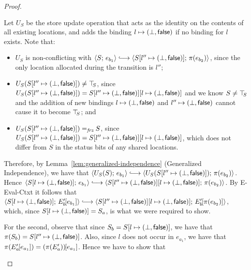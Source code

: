 \begin{proof}
\begin{enumerate}
\begin{enumerate}
\begin{itemize}
          Let $U_S$ be the store update operation that acts as the
          identity on the contents of all existing locations, and adds
          the binding $l \mapsto (\bot, \textsf{false})$ if no
          binding for $l$ exists.  Note that:
          \begin{itemize}
          \item $U_S$ is non-conflicting with $\config{S}{e_{b_1}}
            \parstepsto
            \config{\extS{S}{l''}{\bot}{\frozenfalse}}{\pi(e_{b_2})}$,
            since the only location allocated during the transition is
            $l''$;
          \item $U_S(S[l'' \mapsto (\bot, \textsf{false})]) \neq \top\hspace{-0.85mm}_{S}$,
            since $U_S(S[l'' \mapsto (\bot, \textsf{false})]) =
            S[l'' \mapsto (\bot, \textsf{false})][l \mapsto (\bot, \textsf{false})]$
            and we know $S \neq \top\hspace{-0.85mm}_{S}$ and the addition of new
            bindings $l \mapsto (\bot, \textsf{false})$ and
            $l'' \mapsto (\bot, \textsf{false})$ cannot cause it
            to become $\top\hspace{-0.85mm}_{S}$; and
          \item $U_S(S[l'' \mapsto (\bot, \textsf{false})]) =_{\textit{frz}} S$,
            since $U_S(S[l'' \mapsto (\bot, \textsf{false})]) =
            S[l'' \mapsto (\bot, \textsf{false})][l \mapsto (\bot, \textsf{false})]$,
            which does not differ from $S$ in the status bits of any
            shared locations.
          \end{itemize}

          Therefore, by Lemma~\ref{lem:generalized-independence}
          (Generalized Independence), we have that
          $\config{U_S(S)}{e_{b_1}} \parstepsto
          \config{U_S(\extS{S}{l''}{\bot}{\frozenfalse})}{\pi(e_{b_2})}$.
          Hence $\config{\extS{S}{l}{\bot}{\frozenfalse}}{e_{b_1}}
          \parstepsto
          \config{\extS{\extS{S}{l''}{\bot}{\frozenfalse}}{l}{\bot}{\frozenfalse}}{\pi(e_{b_2})}$.
          By {\sc E-Eval-Ctxt} it follows that
          $\config{\extS{S}{l}{\bot}{\frozenfalse}}{\evalctxt{E'_b}{e_{b_1}}}
          \parstepsto
          \config{\extS{\extS{S}{l''}{\bot}{\frozenfalse}}{l}{\bot}{\frozenfalse}}{\evalctxt{E'_b}{\pi(e_{b_2})}}$,
          which, since $S[l \mapsto (\bot, \textsf{false})] = S_a$, is
          what we were required to show.

          For the second, observe that since $S_b =
          S[l \mapsto (\bot, \textsf{false})]$, we have that $\pi(S_b) =
          S[l'' \mapsto (\bot, \textsf{false})]$.  Also, since $l$ does not occur in
          $e_{a_1}$, we have that $\pi(E'_a\hspace{-1mm}\left[e_{a_1}\right]) =
          (\pi(E'_a))\hspace{-1mm}\left[e_{a_1}\right]$.  Hence we have to show that


\end{itemize}
\end{enumerate}
\end{enumerate}
\end{proof}
